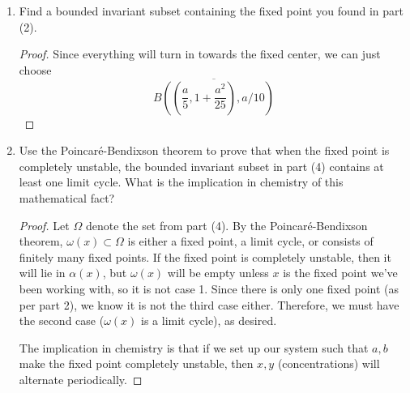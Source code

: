 \documentclass[../psets.tex]{subfiles}
\begin{document}
\begin{enumerate}
\begin{enumerate}
\begin{proof}
            \begin{align*}
                0 &= \chi_A(z)\\
                &= \frac{1}{(25+a^2)^2}\left( a^4z^2-3a^4z+5a^3bz+25a^3b+50a^2z^2+50a^2z+125abz+625ab+625z^2+3125z \right)\\
                0 &= \left[ (25+a^2)^2z^2+(-3a^4+5a^3b+50a^2+125ab+3125)z+25a^3b+625ab \right]
            \end{align*}
            Applying the quadratic formula to the above equation will yield the desired result (when the roots are less than zero, we get stability, and greater than zero implies instability).
        \end{proof}
        \item Find a bounded invariant subset containing the fixed point you found in part (2).
        \begin{proof}
            Since everything will turn in towards the fixed center, we can just choose
            \begin{equation*}
                \overline{B\left( \left( \frac{a}{5},1+\frac{a^2}{25} \right),a/10 \right)}
            \end{equation*}
        \end{proof}
        \item Use the Poincar\'{e}-Bendixson theorem to prove that when the fixed point is completely unstable, the bounded invariant subset in part (4) contains at least one limit cycle. What is the implication in chemistry of this mathematical fact?
        \begin{proof}
            Let $\Omega$ denote the set from part (4). By the Poincar\'{e}-Bendixson theorem, $\omega(x)\subset\Omega$ is either a fixed point, a limit cycle, or consists of finitely many fixed points. If the fixed point is completely unstable, then it will lie in $\alpha(x)$, but $\omega(x)$ will be empty unless $x$ is the fixed point we've been working with, so it is not case 1. Since there is only one fixed point (as per part 2), we know it is not the third case either. Therefore, we must have the second case ($\omega(x)$ is a limit cycle), as desired.\par
            The implication in chemistry is that if we set up our system such that $a,b$ make the fixed point completely unstable, then $x,y$ (concentrations) will alternate periodically.
        \end{proof}
    \end{enumerate}
\end{enumerate}
\end{document}
